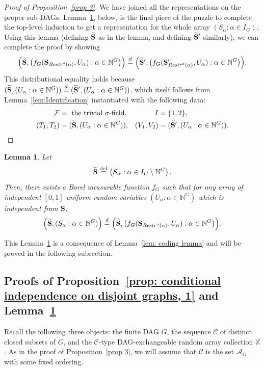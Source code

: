 \documentclass[10pt]{amsart}
\newtheorem{lemm}[theo]{Lemma}\newtheorem{prop}[theo]{Proposition}\newtheorem{coro}[theo]{Corollary}\newtheorem{conj}[theo]{Conjecture}
\theoremstyle{definition}\newtheorem{defi}[theo]{Definition}\newtheorem{rema}[theo]{Remark}\newtheorem{exam}[theo]{Example}\newtheorem{exem}[theo]{Example}\newtheorem{nota}[theo]{Notation}
\newcommand{\alf}{\alpha}%
\newcommand*{\defeq}{\stackrel{\mathrm{def}}{=}}
\renewcommand{\t}{\tilde}
\renewcommand{\d}{\buildrel{d}\over{=}}
\newcommand*\srstr{\mathit{Restr}^o}
\newcommand*\X{\mathbb{X}}
\newcommand*\N{\mathbb{N}}
\renewcommand{\AA}{\mathcal{A}}
\newcommand*\CC{{\mathcal{C}}}
\newcommand*\FF{\mathcal{F}}
\newcommand*\bS{\mathbf{S}}
\let\oldtilde\tilde
\renewcommand*{\tilde}[1]{\mathchoice{\widetilde{#1}}{\widetilde{#1}}{\oldtilde{#1}}{\oldtilde{#1}}}
\begin{document}
\begin{proof}[Proof of Proposition~\ref{prop 3}]
We have joined all the representations on the proper sub-DAGs. Lemma~\ref{lem: final piece}, below, is the final piece of the puzzle to complete the top-level induction to get a representation for the whole array $(S_\alf : \alf \in I_G)$. Using this lemma (defining $\t\bS$ as in the lemma, and defining $\t\bS'$ similarly), we can complete the proof by showing
\[
\Big(\t\bS, \big(f_G(\bS_{\srstr(\alf)}, U_\alf):\alf \in \N^G\big)\Big)
\d
\Big(\t\bS', \big(f_G(\bS'_{\srstr(\alf)}, U_\alf):\alf \in \N^G\big)\Big).
\]
This distributional equality holds because $(\t\bS,(U_\alf:\alf\in \N^G)) \d (\t\bS',(U_\alf:\alf\in \N^G))$, which itself follows from Lemma~\ref{lem:Identification} instantiated with the following data:
\begin{align*}
\FF & = \text{ the trivial $\sigma$-field}, & I & =\{1,2\},
\\
(T_1,T_2) & = (\t\bS,(U_\alf:\alf\in \N^G)), & (V_1,V_2) & =(\t\bS',(U_\alf:\alf\in \N^G)).\qedhere
\end{align*}
\end{proof}
\goodbreak
\begin{lemm}\label{lem: final piece}
Let
\[
\t\bS
\defeq\left(S_\alf :\alf \in I_G \setminus \N^G\right).
\]
Then, there exists a Borel measurable function $f_G$ such that for any array of independent $[0,1]$-uniform random variables $(U_\alf: \alf\in \N^G)$ which is independent from $\bS$,
\begin{equation}\label{equation: final joint}
\Big(\t\bS, (S_\alf:\alf \in \N^G)\Big) \d \Big(\t\bS, \big(f_G(\bS_{\srstr(\alf)}, U_\alf):\alf \in \N^G\big)\Big).
\end{equation}
\end{lemm}

This Lemma~\ref{lem: final piece} is a consequence of Lemma~\ref{lem: coding lemma} and will be proved in the following subsection.


\subsection{Proofs of Proposition~\ref{prop: conditional independence on disjoint graphs, 1} and Lemma~\ref{lem: final piece}}\label{subsection: proof}
{Recall the following three objects: the finite DAG $G$, the sequence $\CC$ of distinct closed subsets of $G$, and the $\CC$-type DAG-exchangeable random array collection $\X$. As in the proof of Proposition~\ref{prop 3}, we will assume that $\CC$ is the set $\AA_G$ with some fixed ordering.}
\end{document}
